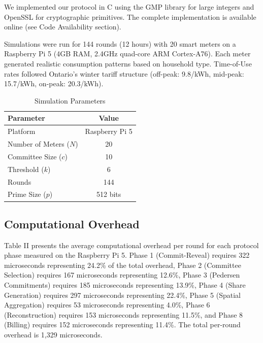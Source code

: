 \documentclass[conference]{IEEEtran}
\begin{document}
We implemented our protocol in C using the GMP library for large integers and OpenSSL for cryptographic primitives. The complete implementation is available online (see Code Availability section).

Simulations were run for 144 rounds (12 hours) with 20 smart meters on a Raspberry Pi 5 (4GB RAM, 2.4GHz quad-core ARM Cortex-A76). Each meter generated realistic consumption patterns based on household type. Time-of-Use rates followed Ontario's winter tariff structure (off-peak: 9.8\textcent/kWh, mid-peak: 15.7\textcent/kWh, on-peak: 20.3\textcent/kWh).

\begin{table}[h]
\centering
\caption{Simulation Parameters}
\label{tab:params}
\begin{tabular}{|l|c|}
\hline
\textbf{Parameter} & \textbf{Value} \\
\hline
Platform & Raspberry Pi 5 \\
Number of Meters ($N$) & 20 \\
Committee Size ($c$) & 10 \\
Threshold ($k$) & 6 \\
Rounds & 144 \\
Prime Size ($p$) & 512 bits \\
\hline
\end{tabular}
\end{table}

\subsection{Computational Overhead}

Table II presents the average computational overhead per round for each protocol phase measured on the Raspberry Pi 5. Phase 1 (Commit-Reveal) requires 322 microseconds representing 24.2\% of the total overhead, Phase 2 (Committee Selection) requires 167 microseconds representing 12.6\%, Phase 3 (Pedersen Commitments) requires 185 microseconds representing 13.9\%, Phase 4 (Share Generation) requires 297 microseconds representing 22.4\%, Phase 5 (Spatial Aggregation) requires 53 microseconds representing 4.0\%, Phase 6 (Reconstruction) requires 153 microseconds representing 11.5\%, and Phase 8 (Billing) requires 152 microseconds representing 11.4\%. The total per-round overhead is 1,329 microseconds.
\end{document}
